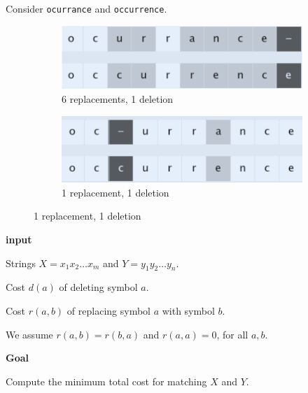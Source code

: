 \begin{example}
    Consider \texttt{ocurrance} and \texttt{occurrence}.

    \begin{figure}[ht!]
        \centering
        \begin{subfigure}[ht!]{0.33\linewidth}
            \centering
            \includegraphics[width=\linewidth]{figures/edit-distance-example-1.png}
            \caption{6 replacements, 1 deletion}
        \end{subfigure}
        \hfil%
        \begin{subfigure}[ht!]{0.33\linewidth}
            \centering
            \includegraphics[width=\linewidth]{figures/edit-distance-example-2.png}
            \caption{1 replacement, 1 deletion}
        \end{subfigure}
    \end{figure}
\end{example}

\begin{listu}
    \item \textbf{input}

    \begin{listu}
        \item Strings $X = x_1 x_2 \dots x_m$ and $Y = y_1 y_2 \dots y_n$.
        \item Cost $d(a)$ of deleting symbol $a$.
        \item Cost $r(a, b)$ of replacing symbol $a$ with symbol $b$.
        
        We assume $r(a, b) = r(b, a)$ and $r(a, a) = 0$, for all $a, b$.
    \end{listu}

    \item \textbf{Goal}

    Compute the minimum total cost for matching $X$ and $Y$.
\end{listu}


